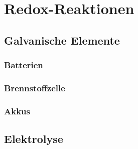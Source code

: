 \section{Redox-Reaktionen}

\subsection{Galvanische Elemente}

\subsubsection{Batterien}

\subsubsection{Brennstoffzelle}

\subsubsection{Akkus}

\subsection{Elektrolyse}


